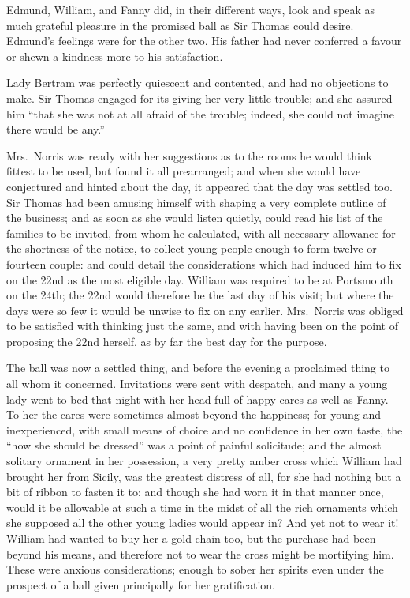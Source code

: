 Edmund, William, and Fanny did, in their different ways,
look and speak as much grateful pleasure in the promised
ball as Sir Thomas could desire.  Edmund's feelings
were for the other two.  His father had never conferred
a favour or shewn a kindness more to his satisfaction.

Lady Bertram was perfectly quiescent and contented,
and had no objections to make.  Sir Thomas engaged
for its giving her very little trouble; and she assured
him ``that she was not at all afraid of the trouble;
indeed, she could not imagine there would be any.''

Mrs.\ Norris was ready with her suggestions as to the rooms he
would think fittest to be used, but found it all prearranged;
and when she would have conjectured and hinted about
the day, it appeared that the day was settled too.
Sir Thomas had been amusing himself with shaping a very
complete outline of the business; and as soon as she
would listen quietly, could read his list of the families
to be invited, from whom he calculated, with all necessary
allowance for the shortness of the notice, to collect
young people enough to form twelve or fourteen couple:
and could detail the considerations which had induced
him to fix on the 22nd as the most eligible day.
William was required to be at Portsmouth on the 24th;
the 22nd would therefore be the last day of his visit;
but where the days were so few it would be unwise to fix
on any earlier.  Mrs.\ Norris was obliged to be satisfied
with thinking just the same, and with having been on the
point of proposing the 22nd herself, as by far the best day
for the purpose.

The ball was now a settled thing, and before the evening
a proclaimed thing to all whom it concerned.  Invitations were
sent with despatch, and many a young lady went to bed that
night with her head full of happy cares as well as Fanny.
To her the cares were sometimes almost beyond the happiness;
for young and inexperienced, with small means of choice
and no confidence in her own taste, the ``how she
should be dressed'' was a point of painful solicitude;
and the almost solitary ornament in her possession,
a very pretty amber cross which William had brought
her from Sicily, was the greatest distress of all,
for she had nothing but a bit of ribbon to fasten it to;
and though she had worn it in that manner once, would it
be allowable at such a time in the midst of all the rich
ornaments which she supposed all the other young ladies
would appear in?  And yet not to wear it!  William had
wanted to buy her a gold chain too, but the purchase had
been beyond his means, and therefore not to wear the cross
might be mortifying him.  These were anxious considerations;
enough to sober her spirits even under the prospect
of a ball given principally for her gratification.

